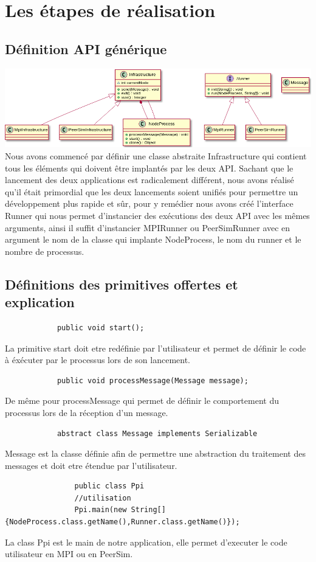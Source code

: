 \documentclass{article}
\begin{document}
		\section{Les étapes de réalisation}
			\subsection{Définition API générique}
			\hspace*{-2cm} \includegraphics[width=19cm]{Ppi_uml.png}
			Nous avons commencé par définir une classe abstraite Infrastructure  qui contient tous les éléments qui doivent être implantés par les deux API.
			\newline
			Sachant que le lancement des deux applications est radicalement différent, nous avons réalisé qu'il était primordial que les deux 
			lancements soient unifiés pour permettre un développement plus rapide et sûr, pour y remédier nous avons créé l'interface Runner qui nous permet 
			d'instancier des exécutions des deux API avec les mêmes arguments, ainsi il suffit d'instancier MPIRunner ou PeerSimRunner avec en argument
			le nom de la classe qui implante NodeProcess, le nom du runner et le nombre de processus.
			\subsection{Définitions des primitives offertes et explication}
			\begin{lstlisting}
			public void start();
			\end{lstlisting}
			La primitive start  doit etre redéfinie par l'utilisateur et permet de définir le code à éxécuter par le processus lors de son lancement.
			\begin{lstlisting}
			public void processMessage(Message message);
			\end{lstlisting}
			De même pour processMessage qui permet  de définir le comportement du processus lors de la réception d'un message.
			\begin{lstlisting}
			abstract class Message implements Serializable
			\end{lstlisting}
			Message est la classe définie afin de permettre une abstraction du traitement des messages et doit etre étendue par l'utilisateur.
			\newpage
			\begin{lstlisting}
				public class Ppi
				//utilisation
				Ppi.main(new String[] {NodeProcess.class.getName(),Runner.class.getName()});
			\end{lstlisting}
			La class Ppi est le main de notre application, elle permet d'executer le code utilisateur en MPI ou en PeerSim.
\end{document}
